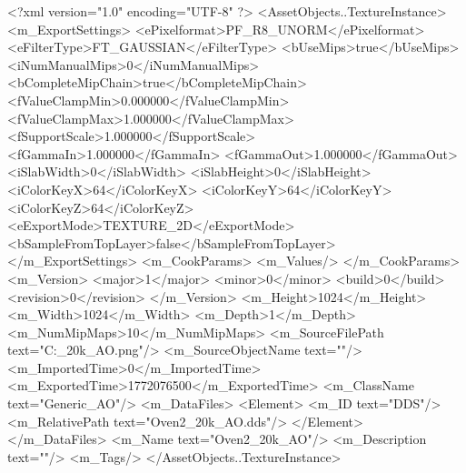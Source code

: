 <?xml version="1.0" encoding="UTF-8" ?>
<AssetObjects..TextureInstance>
	<m_ExportSettings>
		<ePixelformat>PF_R8_UNORM</ePixelformat>
		<eFilterType>FT_GAUSSIAN</eFilterType>
		<bUseMips>true</bUseMips>
		<iNumManualMips>0</iNumManualMips>
		<bCompleteMipChain>true</bCompleteMipChain>
		<fValueClampMin>0.000000</fValueClampMin>
		<fValueClampMax>1.000000</fValueClampMax>
		<fSupportScale>1.000000</fSupportScale>
		<fGammaIn>1.000000</fGammaIn>
		<fGammaOut>1.000000</fGammaOut>
		<iSlabWidth>0</iSlabWidth>
		<iSlabHeight>0</iSlabHeight>
		<iColorKeyX>64</iColorKeyX>
		<iColorKeyY>64</iColorKeyY>
		<iColorKeyZ>64</iColorKeyZ>
		<eExportMode>TEXTURE_2D</eExportMode>
		<bSampleFromTopLayer>false</bSampleFromTopLayer>
	</m_ExportSettings>
	<m_CookParams>
		<m_Values/>
	</m_CookParams>
	<m_Version>
		<major>1</major>
		<minor>0</minor>
		<build>0</build>
		<revision>0</revision>
	</m_Version>
	<m_Height>1024</m_Height>
	<m_Width>1024</m_Width>
	<m_Depth>1</m_Depth>
	<m_NumMipMaps>10</m_NumMipMaps>
	<m_SourceFilePath text="C:\Users\Shadow\Desktop\Prototypes{}_20k_AO.png"/>
	<m_SourceObjectName text=""/>
	<m_ImportedTime>0</m_ImportedTime>
	<m_ExportedTime>1772076500</m_ExportedTime>
	<m_ClassName text="Generic_AO"/>
	<m_DataFiles>
		<Element>
			<m_ID text="DDS"/>
			<m_RelativePath text="Oven2_20k_AO.dds"/>
		</Element>
	</m_DataFiles>
	<m_Name text="Oven2_20k_AO"/>
	<m_Description text=""/>
	<m_Tags/>
</AssetObjects..TextureInstance>

